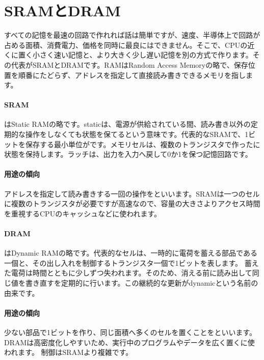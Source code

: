 \section{SRAMとDRAM}
\label{sec:01-digital-computer-13}

すべての記憶を最速の回路で作れれば話は簡単ですが、速度、半導体上で回路が占める面積、消費電力、価格を同時に最良にはできません。そこで、CPUの近くに置く小さく速い記憶と、より大きく少し遅い記憶を別の方式で作ります。その代表がSRAMとDRAMです。RAMはRandom Access Memoryの略で、保存位置を順番にたどらず、アドレスを指定して直接読み書きできるメモリを指します。

\begingroup
\begingroup
\paragraph{SRAM}
        はStatic RAMの略です。staticは、電源が供給されている間、読み書き以外の定期的な操作をしなくても状態を保てるという意味です。代表的なSRAMで、1ビットを保存する最小単位がです。メモリセルは、複数のトランジスタで作ったに状態を保持します。ラッチは、出力を入力へ戻して0か1を保つ記憶回路です。

\paragraph{用途の傾向}
        アドレスを指定して読み書きする一回の操作をといいます。SRAMは一つのセルに複数のトランジスタが必要ですが高速なので、容量の大きさよりアクセス時間を重視するCPUのキャッシュなどに使われます。

\par
\endgroup
\medskip
\begingroup
\paragraph{DRAM}
        はDynamic RAMの略です。代表的なセルは、一時的に電荷を蓄える部品である一個と、その出し入れを制御するトランジスタ一個で1ビットを表します。
        蓄えた電荷は時間とともに少しずつ失われます。そのため、消える前に読み出して同じ値を書き直すを定期的に行います。この継続的な更新がdynamicという名前の由来です。

\paragraph{用途の傾向}
        少ない部品で1ビットを作り、同じ面積へ多くのセルを置くことをといいます。DRAMは高密度化しやすいため、実行中のプログラムやデータを広く置くに使われます。
        制御はSRAMより複雑です。

